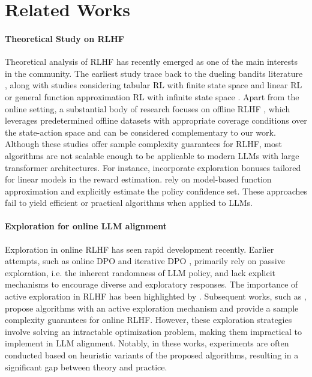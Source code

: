 \section{Related Works}
\paragraph{Theoretical Study on RLHF}
Theoretical analysis of RLHF has recently emerged as one of the main interests in the community. 
The earliest study trace back to the dueling bandits literature \cite{yue2012k, saha2018battle, bengs2021preference}, along with studies considering tabular RL with finite state space \cite{xu2020preference, novoseller2020dueling} and linear RL or general function approximation RL with infinite state space \cite{pacchiano2021dueling,chen2022human, wu2023making, zhan2023query, das2024active, wang2023rlhf}. 
Apart from the online setting, a substantial body of research focuses on offline RLHF \cite{zhu2023principled, zhan2023provable, ji2024self, liu2024provably}, which leverages predetermined offline datasets with appropriate coverage conditions over the state-action space and can be considered complementary to our work.
Although these studies offer sample complexity guarantees for RLHF, most algorithms are not scalable enough to be applicable to modern LLMs with large transformer architectures.
For instance, \cite{pacchiano2021dueling, das2024active} incorporate exploration bonuses tailored for linear models in the reward estimation.
\cite{ chen2022human,zhan2023provable, wang2023rlhf} rely on model-based function approximation and explicitly estimate the policy confidence set. These approaches fail to yield efficient or practical algorithms when applied to LLMs.


\paragraph{Exploration for online LLM alignment}
Exploration in online RLHF has seen rapid development recently.
Earlier attempts, such as online DPO \cite{guo2024direct} and iterative DPO \cite{xu2023some, dong2024rlhf,xiong2024building}, primarily rely on passive exploration, i.e. the inherent randomness of LLM policy, and lack explicit mechanisms to encourage diverse and exploratory responses.
The importance of active exploration in RLHF has been highlighted by \cite{dwaracherla2024efficient}. 
Subsequent works, such as \cite{ye2024theoretical, xiong2024iterative}, propose algorithms with an active exploration mechanism and provide a sample complexity guarantees for online RLHF.
However, these exploration strategies involve solving an intractable optimization problem, making them impractical to implement in LLM alignment. 
Notably, in these works, experiments are often conducted based on heuristic variants of the proposed algorithms, resulting in a significant gap between theory and practice.

